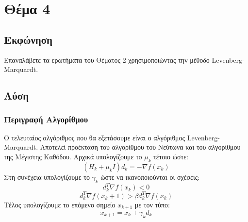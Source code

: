 \documentclass{report}
\begin{document}
\chapter{Θέμα 4}
\section{Εκφώνηση}
Επαναλάβετε τα ερωτήματα του Θέματος 2 χρησιμοποιώντας την μέθοδο 
Levenberg-Marquardt.
\section{Λύση}
\subsection{Περιγραφή Αλγορίθμου}
Ο τελευταίος αλγόριθμος που θα εξετάσουμε είναι ο αλγόριθμος 
Levenberg-Marquardt. Αποτελεί προέκταση του αλγορίθμου του Νεύτωνα και
του αλγορίθμου της Μέγιστης Καθόδου. Αρχικά υπολογίζουμε το $μ_k$ τέτοιο ώστε:
$$(H_k + μ_kI)d_k = -\nabla f(x_k)$$
Στη συνέχεια υπολογίζουμε το $\gamma_k$ ώστε να ικανοποιούνται οι σχέσεις:
$$d_k^T\nabla f(x_k) < 0$$
$$d_k^T\nabla f(x_k+1) > \beta d_k^T\nabla f(x_k)$$
Τέλος υπολογίζουμε το επόμενο σημείο $x_{k+1}$ με τον τύπο:
$$x_{k+1} = x_k + \gamma_k d_k$$
\end{document}

